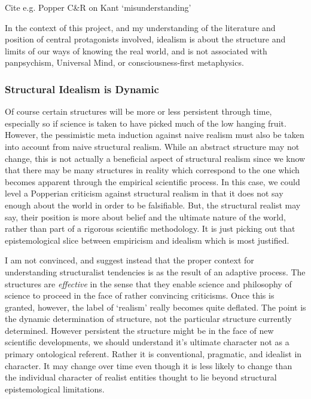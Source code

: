Cite e.g. Popper C\&R on Kant `misunderstanding'

In the context of this project, and my understanding of the literature and position of central protagonists involved, idealism is about the structure and limits of our ways of knowing the real world, and is not associated with panpsychism, Universal Mind, or consciousness-first metaphysics.


\subsubsection{Structural Idealism is Dynamic}

Of course certain structures will be more or less persistent through time, especially so if science is taken to have picked much of the low hanging fruit.  However, the pessimistic meta induction against naive realism must also be taken into account from naive structural realism.  While an abstract structure may not change, this is not actually a beneficial aspect of structural realism since we know that there may be many structures in reality which correspond to the one which becomes apparent through the empirical scientific process.  In this case, we could level a Popperian criticism against structural realism in that it does not say enough about the world in order to be falsifiable.  But, the structural realist may say, their position is more about belief and the ultimate nature of the world, rather than part of a rigorous scientific methodology.  It is just picking out that epistemological slice between empiricism and idealism which is most justified.

I am not convinced, and suggest instead that the proper context for understanding structuralist tendencies is as the result of an adaptive process.  The structures are \emph{effective} in the sense that they enable science and philosophy of science to proceed in the face of rather convincing criticisms.  Once this is granted, however, the label of `realism' really becomes quite deflated.  The point is the dynamic determination of structure, not the particular structure currently determined. However persistent the structure might be in the face of new scientific developments, we should understand it's ultimate character not as a primary ontological referent.  Rather it is conventional, pragmatic, and idealist in character.  It may change over time even though it is less likely to change than the individual character of realist entities thought to lie beyond structural epistemological limitations.







